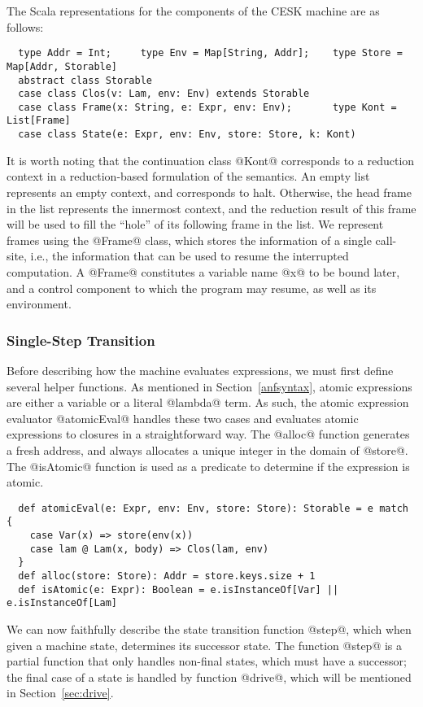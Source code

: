 \documentclass[acmsmall, review]{acmart}\settopmatter{}
\begin{document}
The Scala representations for the components of the CESK machine are as follows:

\begin{lstlisting}
  type Addr = Int;     type Env = Map[String, Addr];    type Store = Map[Addr, Storable]
  abstract class Storable
  case class Clos(v: Lam, env: Env) extends Storable
  case class Frame(x: String, e: Expr, env: Env);       type Kont = List[Frame]
  case class State(e: Expr, env: Env, store: Store, k: Kont)
\end{lstlisting}

It is worth noting that the continuation class @Kont@ corresponds to a reduction 
context in a reduction-based formulation of the semantics.
An empty list represents an empty context, and corresponds to halt. Otherwise, the head 
frame in the list represents the innermost context, and the reduction result of this 
frame will be used to fill the ``hole'' of its following frame in the list.
We represent frames using the @Frame@ class, which stores the information of a single
call-site, i.e., the information that can be used to resume the interrupted computation.
A @Frame@ constitutes a variable name @x@ to be bound later, and a control component
to which the program may resume, as well as its environment.

\subsubsection{Single-Step Transition}
Before describing how the machine evaluates expressions, we must first define several helper
functions. As mentioned in Section~\ref{anfsyntax}, atomic expressions are either a variable
or a literal @lambda@ term. As such, the atomic expression evaluator @atomicEval@ handles
these two cases and evaluates atomic expressions to closures in a straightforward way.
The @alloc@ function generates a fresh address, and always allocates a unique integer
in the domain of @store@.
The @isAtomic@ function is used as a predicate to determine if the expression is atomic.

\begin{lstlisting}
  def atomicEval(e: Expr, env: Env, store: Store): Storable = e match {
    case Var(x) => store(env(x))
    case lam @ Lam(x, body) => Clos(lam, env)
  }
  def alloc(store: Store): Addr = store.keys.size + 1
  def isAtomic(e: Expr): Boolean = e.isInstanceOf[Var] || e.isInstanceOf[Lam]
\end{lstlisting}

We can now faithfully describe the state transition function @step@,
which when given a machine state, determines its successor state.
The function @step@ is a partial function that only handles non-final states,
which must have a successor; the final case of a state is handled by function
@drive@, which will be mentioned in Section~\ref{sec:drive}.
\end{document}

